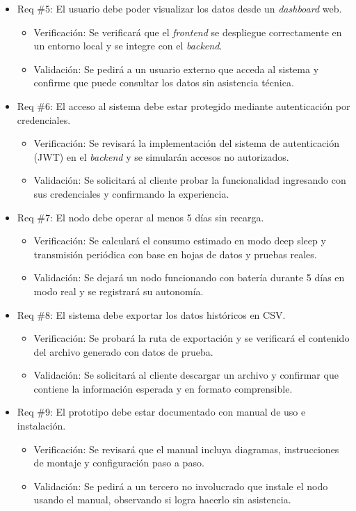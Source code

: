\documentclass[
11pt, %
]{charter}
\begin{document}
\begin{itemize}
\item Req \#5: El usuario debe poder visualizar los datos desde un \textit{dashboard} web.
\begin{itemize}
	\item Verificación: Se verificará que el \textit{frontend} se despliegue correctamente en un entorno local y se integre con el \textit{backend}.
	\item Validación: Se pedirá a un usuario externo que acceda al sistema y confirme que puede consultar los datos sin 
    asistencia técnica.
\end{itemize}

\item Req \#6: El acceso al sistema debe estar protegido mediante autenticación por credenciales.
\begin{itemize}
	\item Verificación: Se revisará la implementación del sistema de autenticación (JWT) en el \textit{backend} y se simularán accesos 
    no autorizados.
	\item Validación: Se solicitará al cliente probar la funcionalidad ingresando con sus credenciales y confirmando la 
    experiencia.
\end{itemize}

\item Req \#7: El nodo debe operar al menos 5 días sin recarga.
\begin{itemize}
	\item Verificación: Se calculará el consumo estimado en modo deep sleep y transmisión periódica con base en hojas de datos 
    y pruebas reales.
	\item Validación: Se dejará un nodo funcionando con batería durante 5 días en modo real y se registrará su autonomía.
\end{itemize}

\item Req \#8: El sistema debe exportar los datos históricos en CSV.
\begin{itemize}
	\item Verificación: Se probará la ruta de exportación y se verificará el contenido del archivo generado con datos de prueba.
	\item Validación: Se solicitará al cliente descargar un archivo y confirmar que contiene la información esperada y en 
    formato comprensible.
\end{itemize}

\item Req \#9: El prototipo debe estar documentado con manual de uso e instalación.
\begin{itemize}
	\item Verificación: Se revisará que el manual incluya diagramas, instrucciones de montaje y configuración paso a paso.
	\item Validación: Se pedirá a un tercero no involucrado que instale el nodo usando el manual, observando si 
    logra hacerlo sin asistencia.
\end{itemize}


\end{itemize}
\end{document}
